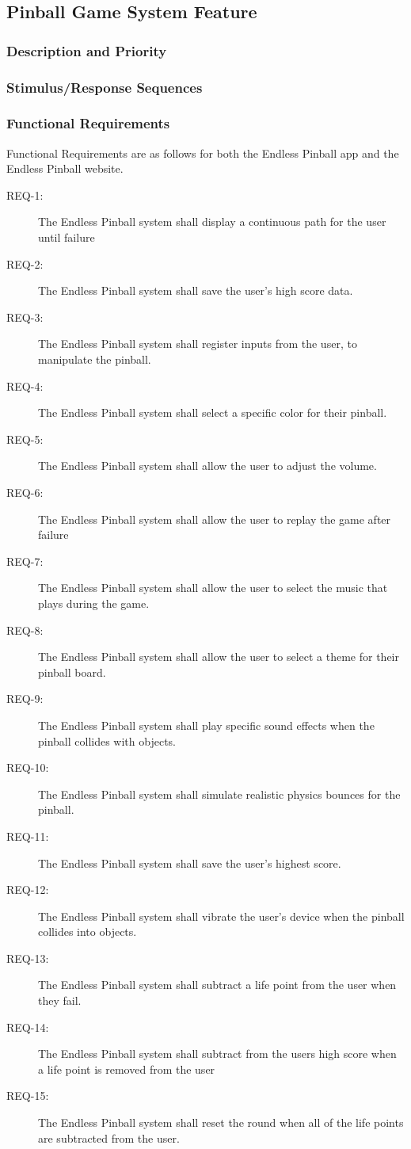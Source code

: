\documentclass[11pt]{article}
\begin{document}
\subsection{Pinball Game System Feature}
\label{sec:org1723b22}
\subsubsection{Description and Priority}
\label{sec:orgf891884}
\subsubsection{Stimulus/Response Sequences}
\label{sec:orga2aede4}
\subsubsection{Functional Requirements}
\label{sec:orgfd58507}
Functional Requirements are as follows for both the Endless Pinball app and the Endless Pinball website. 
\begin{description}
\item[{REQ-1:}] The Endless Pinball system shall display a continuous path for the user until failure
\item[{REQ-2:}] The Endless Pinball system shall save the user’s high score data.
\item[{REQ-3:}] The Endless Pinball system shall register inputs from the user, to manipulate the pinball.
\item[{REQ-4:}] The Endless Pinball system shall select a specific color for their pinball.
\item[{REQ-5:}] The Endless Pinball system shall allow the user to adjust the volume.
\item[{REQ-6:}] The Endless Pinball system shall allow the user to replay the game after failure
\item[{REQ-7:}] The Endless Pinball system shall allow the user to select the music that plays during the game.
\item[{REQ-8:}] The Endless Pinball system shall allow the user to select a theme for their pinball board.
\item[{REQ-9:}] The Endless Pinball system shall play specific sound effects when the pinball collides with objects.
\item[{REQ-10:}] The Endless Pinball system shall simulate realistic physics bounces for the pinball.
\item[{REQ-11:}] The Endless Pinball system shall save the user’s highest score.
\item[{REQ-12:}] The Endless Pinball system shall vibrate the user’s device when the pinball collides into objects.
\item[{REQ-13:}] The Endless Pinball system shall subtract a life point from the user when they fail.
\item[{REQ-14:}] The Endless Pinball system shall subtract from the users high score when a life point is removed from the user
\item[{REQ-15:}] The Endless Pinball system shall reset the round when all of the life points are subtracted from the user.
\end{description}
\end{document}
